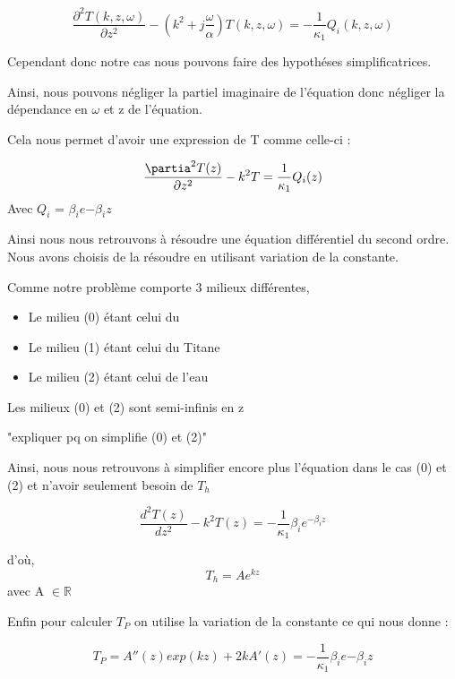 \documentclass{rapportECC}
\begin{document}
\begin{equation}
    \frac{\partial^2 T(k,z,\omega)}{\partial z^2} - (k^2 + j\frac{\omega}{\alpha}) T(k,z,\omega) = - \frac{1}{\kappa_1} Q_i(k,z,\omega)
\end{equation}

Cependant donc notre cas nous pouvons faire des hypothéses simplificatrices.

Ainsi, nous pouvons négliger la partiel imaginaire de l'équation donc négliger la dépendance en $\omega$ et z de l'équation.

Cela nous permet d'avoir une expression de T comme celle-ci :

\begin{equation}
    \frac{\partia^2 T(z)}{\partial z^2} - k^2 T = \frac{1}{\kappa_1}Q_i(z)
\end{equation}
Avec $Q_i$ = $\beta_i e{-\beta_i z}$


Ainsi nous nous retrouvons à résoudre une équation différentiel du second ordre.\\
Nous avons choisis de la résoudre en utilisant variation de la constante.

Comme notre problème comporte 3 milieux différentes,
\begin{itemize}
    \item Le milieu (0) étant celui du 
    \item Le milieu (1) étant celui du Titane
    \item Le milieu (2) étant celui de l'eau
\end{itemize}

Les milieux (0) et (2) sont semi-infinis en z 

"expliquer pq on simplifie (0) et (2)"

Ainsi, nous nous retrouvons à simplifier encore plus l'équation dans le cas (0) et (2) et n'avoir seulement besoin de $T_h$

\begin{equation*}
    \frac{d^2 T(z)}{d z^2} - k^2 T(z) = - \frac{1}{\kappa_1}\beta_i e^{-\beta_iz}
\end{equation*}

d'où,
\begin{equation}
    T_h = A e^{kz} 
\end{equation}
avec A $\in \mathbb{R}$

Enfin pour calculer $T_P$ on utilise la variation de la constante ce qui nous donne :

\begin{equation*}
            T_P = A''(z)exp(kz) + 2k A'(z) = - \frac{1}{\kappa_1}\beta_i e{-\beta_iz} 
\end{equation*}
\end{document}
